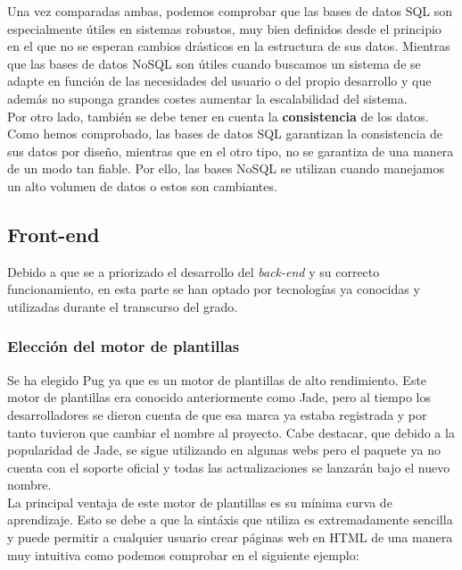 Una vez comparadas ambas, podemos comprobar que las bases de datos SQL son especialmente útiles en sistemas robustos, muy bien definidos desde el principio
en el que no se esperan cambios drásticos en la estructura de sus datos. Mientras que las bases de datos NoSQL son útiles cuando buscamos un sistema de se adapte en función de las necesidades del usuario o del propio desarrollo y que además no suponga grandes costes aumentar la escalabilidad del sistema.\\

Por otro lado, también se debe tener en cuenta la \textbf{consistencia} de los datos. Como hemos comprobado, las bases de datos SQL garantizan la consistencia de sus datos por diseño, mientras que en el otro tipo, no se garantiza de una manera de un modo tan fiable. Por ello, las bases NoSQL se utilizan cuando manejamos un alto volumen de datos o estos son cambiantes. 


\subsection{Front-end}

Debido a que se a priorizado el desarrollo del \textit{back-end} y su correcto funcionamiento, en esta parte se han optado por tecnologías ya conocidas y utilizadas durante el transcurso del grado.

\subsubsection{Elección del motor de plantillas}

Se ha elegido Pug\cite{pug} ya que es un motor de plantillas de alto rendimiento. Este motor de plantillas era conocido anteriormente como Jade\cite{jade}, pero al tiempo
los desarrolladores se dieron cuenta de que esa marca ya estaba registrada y por tanto tuvieron que cambiar el nombre al proyecto. Cabe destacar,
que debido a la popularidad de Jade, se sigue utilizando en algunas webs pero el paquete ya no cuenta con el soporte oficial y todas las actualizaciones se lanzarán bajo el nuevo nombre. \\

La principal ventaja de este motor de plantillas es su mínima curva de aprendizaje. Esto se debe a que la sintáxis que utiliza es extremadamente sencilla y puede permitir a cualquier usuario crear páginas web en HTML de una manera muy intuitiva como podemos comprobar en el siguiente ejemplo:

